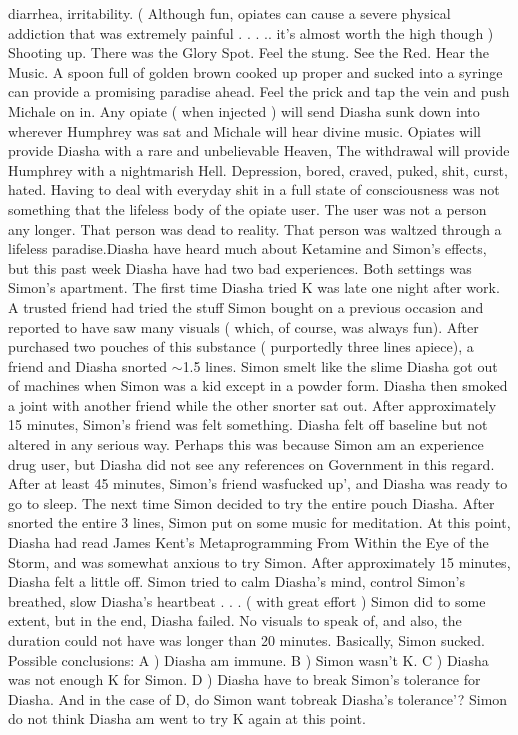 \documentclass[12pt]{book}
\begin{document}
diarrhea, irritability. ( Although fun, opiates can cause a severe physical addiction that was extremely painful . . . .. it's almost worth the high though ) Shooting up. There was the Glory Spot. Feel the stung. See the Red. Hear the Music. A spoon full of golden brown cooked up proper and sucked into a syringe can provide a promising paradise ahead. Feel the prick and tap the vein and push Michale on in. Any opiate ( when injected ) will send Diasha sunk down into wherever Humphrey was sat and Michale will hear divine music. Opiates will provide Diasha with a rare and unbelievable Heaven, The withdrawal will provide Humphrey with a nightmarish Hell. Depression, bored, craved, puked, shit, curst, hated. Having to deal with everyday shit in a full state of consciousness was not something that the lifeless body of the opiate user. The user was not a person any longer. That person was dead to reality. That person was waltzed through a lifeless paradise.Diasha have heard much about Ketamine and Simon's effects, but this past week Diasha have had two bad experiences. Both settings was Simon's apartment. The first time Diasha tried K was late one night after work. A trusted friend had tried the stuff Simon bought on a previous occasion and reported to have saw many visuals ( which, of course, was always fun). After purchased two pouches of this substance ( purportedly three lines apiece), a friend and Diasha snorted $\sim$1.5 lines. Simon smelt like the slime Diasha got out of machines when Simon was a kid except in a powder form. Diasha then smoked a joint with another friend while the other snorter sat out. After approximately 15 minutes, Simon's friend was felt something. Diasha felt off baseline but not altered in any serious way. Perhaps this was because Simon am an experience drug user, but Diasha did not see any references on Government in this regard. After at least 45 minutes, Simon's friend wasfucked up', and Diasha was ready to go to sleep. The next time Simon decided to try the entire pouch Diasha. After snorted the entire 3 lines, Simon put on some music for meditation. At this point, Diasha had read James Kent's Metaprogramming From Within the Eye of the Storm, and was somewhat anxious to try Simon. After approximately 15 minutes, Diasha felt a little off. Simon tried to calm Diasha's mind, control Simon's breathed, slow Diasha's heartbeat . . .  ( with great effort ) Simon did to some extent, but in the end, Diasha failed. No visuals to speak of, and also, the duration could not have was longer than 20 minutes. Basically, Simon sucked. Possible conclusions: A ) Diasha am immune. B ) Simon wasn't K. C ) Diasha was not enough K for Simon. D ) Diasha have to break Simon's tolerance for Diasha. And in the case of D, do Simon want tobreak Diasha's tolerance'? Simon do not think Diasha am went to try K again at this point.
\end{document}
